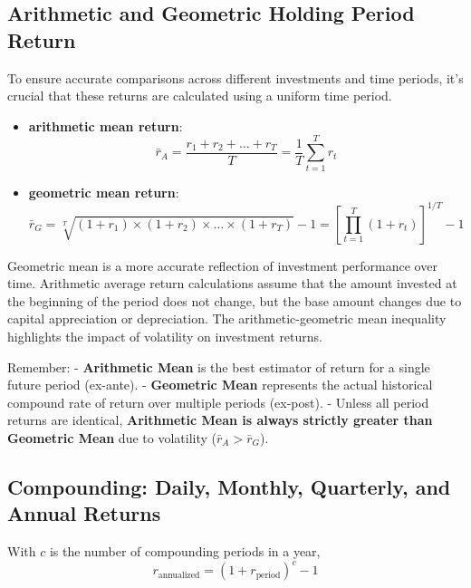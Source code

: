 \subsection{Arithmetic and Geometric Holding Period Return}
	\label{subsec:Arithmetic and Geometric Holding Period Return}
To ensure accurate comparisons across different investments and time periods, it's crucial that these returns are calculated using a uniform time period.
\begin{itemize}
	\item \textbf{arithmetic mean return}:
	\begin{equation}
		\bar{r}_A = \frac{r_1 + r_2 + \dots + r_T}{T} = \frac{1}{T}\sum_{t=1}^{T}r_t
		\label{eq:arithmetic_mean}
	\end{equation}

	\item \textbf{geometric mean return}:
	\begin{equation}
		\bar{r}_G = \sqrt[T]{(1 + r_1) \times (1 + r_2) \times \dots \times (1 + r_T)} - 1 = \left[ \prod_{t=1}^{T}(1+r_t) \right]^{1/T} - 1
		\label{eq:geometric_mean}
	\end{equation}
\end{itemize}

Geometric mean is a more accurate reflection of investment performance over time.
Arithmetic average return calculations assume that the amount invested at the beginning of the period does not change,
but the base amount changes due to capital appreciation or depreciation.
The arithmetic-geometric mean inequality highlights the impact of volatility on investment returns.

\begin{examtip}
Remember:
- \textbf{Arithmetic Mean} is the best estimator of return for a single future period (ex-ante).
- \textbf{Geometric Mean} represents the actual historical compound rate of return over multiple periods (ex-post).
- Unless all period returns are identical, \textbf{Arithmetic Mean is always strictly greater than Geometric Mean} due to volatility ($ \bar{r}_A > \bar{r}_G $).
\end{examtip}

\subsection{Compounding: Daily, Monthly, Quarterly, and Annual Returns}
	\label{subsec:Compounding: Daily, Monthly, Quarterly, and Annual Returns}
With $c$ is the number of compounding periods in a year,
\begin{equation}
	r_{\text{annualized}} = (1 + r_{\text{period}})^c - 1
	\label{eq:annualized_return}
\end{equation}

